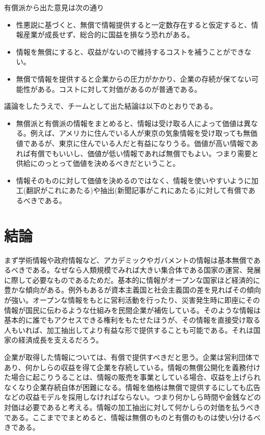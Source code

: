\documentclass[12pt,a4j]{jarticle}
\begin{document}
有償派から出た意見は次の通り

\begin{itemize}
\item 性悪説に基づくと、無償で情報提供すると一定数存在すると仮定すると、情報産業が成長せず、総合的に国益を損なう恐れがある。
\item 情報を無償にすると、収益がないので維持するコストを補うことができない。
\item 無償で情報を提供すると企業からの圧力がかかり、企業の存続が保てない可能性がある。コストに対して対価があるのが普通である。
\end{itemize}

議論をしたうえで、チームとして出た結論は以下のとおりである。

\begin{itemize}
\item 無償派と有償派の情報をまとめると、情報は受け取る人によって価値は異なる。例えば、アメリカに住んでいる人が東京の気象情報を受け取っても無価値であるが、東京に住んでいる人だと有益になりうる。価値が高い情報であれば有償でもいいし、価値が低い情報であれば無償でもよい。つまり需要と供給にのっとって価値を決めるべきだということ。
\item 情報そのものに対して価値を決めるのではなく、情報を使いやすいように加工(翻訳がこれにあたる)や抽出(新聞記事がこれにあたる)に対して有償であるべきである。
\end{itemize}

\section{結論}
まず学術情報や政府情報など、アカデミックやガバメントの情報は基本無償であるべきである。なぜなら人類規模でみれば大きい集合体である国家の運営、発展に際して必要なものであるためだ。基本的に情報がオープンな国家ほど経済的に豊かな傾向がある。例外もあるが資本主義国と社会主義国の差を見ればその傾向が強い。オープンな情報をもとに営利活動を行ったり、災害発生時に即座にその情報が国民に伝わるような仕組みを民間企業が補佐している。そのような情報は基本的に誰でもアクセスできる権利をもたせたほうが、その情報を直接受け取る人もいれば、加工抽出してより有益な形で提供することも可能である。それは国家の経済成長を支えるだろう。

企業が取得した情報については、有償で提供すべきだと思う。企業は営利団体であり、何かしらの収益を得て企業を存続している。情報の無償公開化を義務付けた場合に起こりうることは、情報の販売を事業としている場合、収益を上げられなくなり企業存続自体が困難になる。情報を価格は無償で提供するにしても広告などの収益モデルを採用しなければならない。つまり何かしら時間や金銭などの対価は必要であると考える。情報の加工抽出に対して何かしらの対価を払うべきである。ここまででまとめると、情報は無償のものと有償のものは使い分けるべきである。
\end{document}

